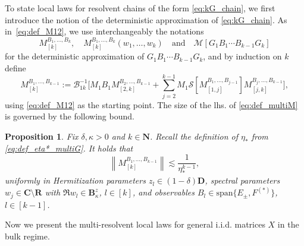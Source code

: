 \documentclass[10pt]{amsart}
\newtheorem{proposition}[theorem]{Proposition}
\numberwithin{equation}{section}
\newcommand{\R}{\mathbf{R}}
\newcommand{\C}{\mathbf{C}}
\newcommand{\N}{\mathbf{N}}
\begin{document}
To state local laws for resolvent chains of the form \eqref{eq:kG_chain}, we first introduce the notion of the deterministic approximation of \eqref{eq:kG_chain}. As in~\eqref{eq:def_M12}, we use interchangeably the notations
\begin{equation*}
M_{[k]}^{B_1,\ldots,B_k},\quad M_{[k]}^{B_1,\ldots,B_k}(w_1,\ldots, w_k)\quad \text{and}\quad\mathcal{M}\left[G_1B_1\cdots B_{k-1}G_k\right]
\end{equation*}
for the deterministic approximation of $G_1B_1\cdots B_{k-1}G_k$, and by induction on $k$ define
\begin{equation}
M_{[k]}^{B_1,\ldots,B_{k-1}}:=\mathcal{B}_{1k}^{-1}\bigg[M_1B_1 M_{[2,k]}^{B_2,\ldots,B_{k-1}} + \sum_{j=2}^{k-1} M_1\mathcal{S}\left[ M_{[1,j]}^{B_1,\ldots,B_{j-1}}\right] M_{[j,k]}^{B_j,\ldots,B_{k-1}}\bigg],
\label{eq:def_multiM}
\end{equation}
using \eqref{eq:def_M12} as the starting point. The size of the lhs. of \eqref{eq:def_multiM} is governed by the following bound.

\begin{proposition}\label{prop:multiM_bound} Fix $\delta,\kappa>0$ and $k\in\N$. Recall the definition of $\eta_*$ from \eqref{eq:def_eta*_multiG}. It holds that
\begin{equation}
\left\lVert M_{[k]}^{B_1,\ldots,B_{k-1}}\right\rVert \lesssim \frac{1}{\eta_*^{k-1}},
\label{eq:multiM_bound}
\end{equation}
uniformly in Hermitization parameters $z_l\in (1-\delta)\mathbf{D}$, spectral parameters $w_j\in\C\setminus\R$ with $\Re w_l\in \mathbf{B}_\kappa^z$, $l\in[k]$, and observables $B_l\in \mathrm{span}\{E_\pm,F^{(*)}\}$, $l\in[k-1]$.
\end{proposition}

Now we present the multi-resolvent local laws for general i.i.d. matrices $X$ in the bulk regime.
\end{document}
